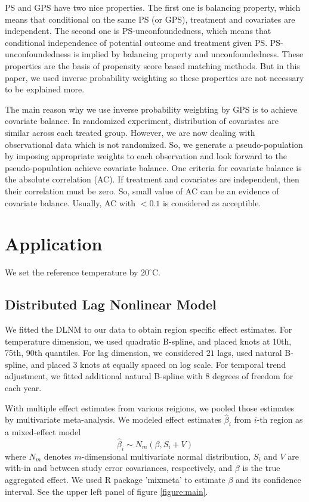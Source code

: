 \documentclass[12pt]{article}
\begin{document}
PS and GPS have two nice properties\cite{rosenbaum1983, hirano2004}.
The first one is balancing property, which means that conditional on the same PS (or GPS),
treatment and covariates are independent.
The second one is PS-unconfoundedness, 
which means that conditional independence of potential outcome and treatment given PS.
PS-unconfoundedness is implied by balancing property and unconfoundedness.
These properties are the basis of propensity score based matching methods.
But in this paper, 
we used inverse probability weighting so these properties are not necessary to be explained more.

The main reason why we use inverse probability weighting by GPS is to achieve covariate balance.
In randomized experiment, distribution of covariates are similar across each treated group.
However, we are now dealing with observational data which is not randomized.
So, we generate a pseudo-population by imposing appropriate weights to each observation
and look forward to the pseudo-population achieve covariate balance.
One criteria for covariate balance is the absolute correlation (AC)\cite{gpsboosting2015}.
If treatment and covariates are independent, then their correlation must be zero.
So, small value of AC can be an evidence of covariate balance.
Usually, AC with $ <0.1 $ is considered as acceptible.


\section{Application}
\label{section:application}

We set the reference temperature by $20^\circ$C.
\subsection{Distributed Lag Nonlinear Model}

We fitted the DLNM to our data to obtain region specific effect estimates.
For temperature dimension, 
we used quadratic B-spline, and placed knots at 10th, 75th, 90th quantiles.
For lag dimension,
we considered $21$ lags, used natural B-spline, and placed $3$ knots at equally spaced on log scale.
For temporal trend adjustment,
we fitted additional natural B-spline with $8$ degrees of freedom for each year.

With multiple effect estimates from various reigions,
we pooled those estimates by multivariate meta-analysis.
We modeled effect estimates $\hat{\beta}_i$ from $i$-th region as a mixed-effect model
\[
	\hat{\beta}_i \sim N_m(\beta, S_i + V)
\]
where $N_m$ denotes $m$-dimensional multivariate normal distribution,
$S_i$ and $V$ are with-in and between study error covariances, respectively,
and $\beta$ is the true aggregated effect.
We used R package 'mixmeta' to estimate $\beta$ and its confidence interval.
See the upper left panel of figure \ref{figure:main}.
\end{document}
